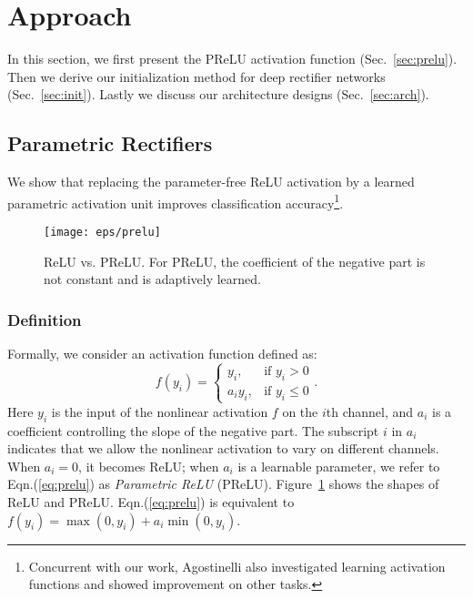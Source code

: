 \documentclass[10pt,twocolumn,letterpaper]{article}
\begin{document}
\section{Approach}

In this section, we first present the PReLU activation function (Sec.~\ref{sec:prelu}). Then we derive our initialization method for deep rectifier networks (Sec.~\ref{sec:init}). Lastly we discuss our architecture designs (Sec.~\ref{sec:arch}).

\subsection{Parametric Rectifiers}

We show that replacing the parameter-free ReLU activation by a learned parametric activation unit improves classification accuracy\footnote{Concurrent with our work, Agostinelli \etal \cite{Agostinelli2014} also investigated learning activation functions and showed improvement on other tasks.}.

\begin{figure}[t]
\begin{center}
\texttt{[image: eps/prelu]}
\end{center}
\caption{ReLU vs. PReLU. For PReLU, the coefficient of the negative part is not constant and is adaptively learned.}
\label{fig:prelu}
\end{figure}

\subsubsection*{Definition}

\label{sec:prelu}
Formally, we consider an activation function defined as:
\begin{equation}\label{eq:prelu}
f(y_i) = \begin{cases} y_i, & \mbox{if } y_i > 0 \\ a_i y_i, & \mbox{if } y_i \leq 0 \end{cases}.
\end{equation}
Here $y_i$ is the input of the nonlinear activation $f$ on the $i$th channel, and $a_i$ is a coefficient controlling the slope of the negative part. The subscript $i$ in $a_i$ indicates that we allow the nonlinear activation to vary on different channels. When $a_i = 0$, it becomes ReLU; when $a_i$ is a learnable parameter, we refer to Eqn.(\ref{eq:prelu}) as \emph{Parametric ReLU} (PReLU). Figure~\ref{fig:prelu} shows the shapes of ReLU and PReLU.
Eqn.(\ref{eq:prelu}) is equivalent to $f(y_i) = \max(0, y_i)+a_i\min(0, y_i)$.
\end{document}
